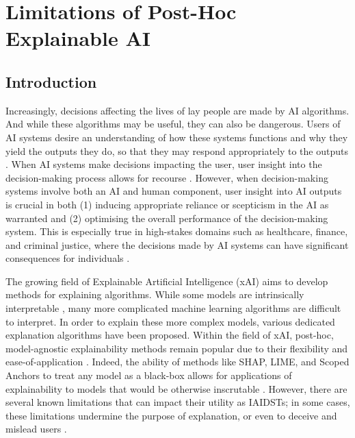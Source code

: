 

\chapter{\label{ch:xailimitations}Limitations of Post-Hoc Explainable AI}

\minitoc

\section{Introduction}
Increasingly, decisions affecting the lives of lay people are made by AI algorithms. And while these algorithms may be useful, they can also be dangerous. Users of AI systems desire an understanding of how these systems functions and why they yield the outputs they do, so that they may respond appropriately to the outputs \cite{binns_human_2022}. When AI systems make decisions impacting the user, user insight into the decision-making process allows for recourse \cite{ustun_actionable_2019}. However, when decision-making systems involve both an AI and human component, user insight into AI outputs is crucial in both (1) inducing appropriate reliance or scepticism in the AI as warranted and (2) optimising the overall performance of the decision-making system. This is especially true in high-stakes domains such as healthcare, finance, and criminal justice, where the decisions made by AI systems can have significant consequences for individuals \cite{binns_human_2022,ustun_actionable_2019,wachter_counterfactual_2017}.

The growing field of Explainable Artificial Intelligence (xAI) aims to develop methods for explaining algorithms. While some models are intrinsically interpretable \cite{rudin_interpretable_2021}, many more complicated machine learning algorithms are difficult to interpret. In order to explain these more complex models, various dedicated explanation algorithms have been proposed. Within the field of xAI, post-hoc, model-agnostic explainability methods remain popular due to their flexibility and ease-of-application \cite{molnar_interpretable_2019}. Indeed, the ability of methods like SHAP, LIME, and Scoped Anchors to treat any model as a black-box allows for applications of explainability to models that would be otherwise inscrutable \cite{lundberg_unified_2017,ribeiro_why_2016,ribeiro_anchors_2018}. However, there are several known limitations that can impact their utility as IAIDSTs; in some cases, these limitations undermine the purpose of explanation, or even to deceive and mislead users \cite{wang_transparency_2022}. 

